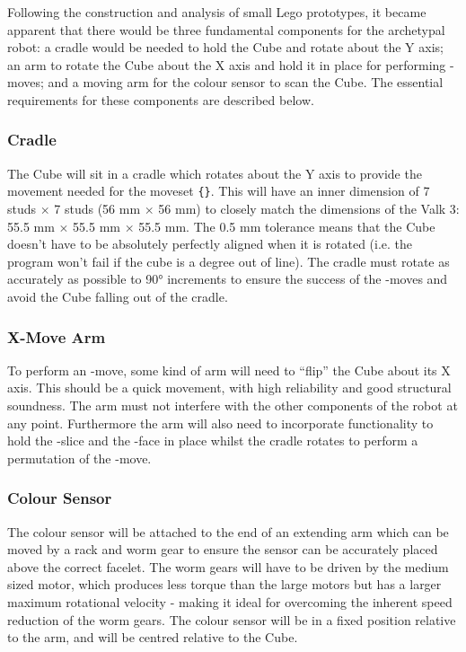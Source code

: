 \documentclass{report}
\newcommand{\moveset}[1]{\uppercase{\texttt{\{\formatmoves{#1}\}}}}
\newcommand{\face}[1]{\uppercase{\texttt{\formatmovesnospace{#1}}}-face}
\newcommand{\move}[1]{\uppercase{\texttt{\formatmovesnospace{#1}}}-move}
\newcommand{\slice}[1]{\uppercase{\texttt{\formatmovesnospace{#1}}}-slice}
\begin{document}
    Following the construction and analysis of small Lego prototypes, it became apparent that there would be three fundamental components for the archetypal robot: a cradle would be needed to hold the Cube and rotate about the Y axis; an arm to rotate the Cube about the X axis and hold it in place for performing \move{d}s; and a moving arm for the colour sensor to scan the Cube. The essential requirements for these components are described below.
    
    \subsubsection{Cradle}
    
    The Cube will sit in a cradle which rotates about the Y axis to provide the movement needed for the moveset \moveset{Y.Y'y2D.D'd"}. This will have an inner dimension of 7 studs $\times$ 7 studs (56 \si{\milli\metre} $\times$ 56 \si{\milli\metre}) to closely match the dimensions of the Valk 3: 55.5 \si{\milli\metre} $\times$ 55.5 \si{\milli\metre} $\times$ 55.5 \si{\milli\metre}. The 0.5 \si{\milli\metre} tolerance means that the Cube doesn't have to be absolutely perfectly aligned when it is rotated (i.e. the program won't fail if the cube is a degree out of line). The cradle must rotate as accurately as possible to \ang{90} increments to ensure the success of the \move{x}s and avoid the Cube falling out of the cradle. 
    
    \subsubsection{X-Move Arm}
    To perform an \move{x}, some kind of arm will need to \enquote{flip} the Cube about its X axis. This should be a quick movement, with high reliability and good structural soundness. The arm must not interfere with the other components of the robot at any point. Furthermore the arm will also need to incorporate functionality to hold the \slice{l-r} and the \face{u} in place whilst the cradle rotates to perform a permutation of the \move{d}.
    
    \subsubsection{Colour Sensor}
    The colour sensor will be attached to the end of an extending arm which can be moved by a rack and worm gear to ensure the sensor can be accurately placed above the correct facelet. The worm gears will have to be driven by the medium sized motor, which produces less torque than the large motors but has a larger maximum rotational velocity - making it ideal for overcoming the inherent speed reduction of the worm gears. The colour sensor will be in a fixed position relative to the arm, and will be centred relative to the Cube.
    
\end{document}
